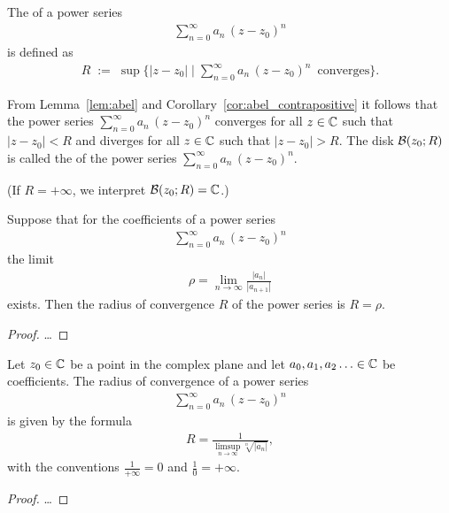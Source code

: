 \begin{definition}
  \label{def:radius_of_convergence}
  The  of a power series
  \begin{align*}
    \sum_{n=0}^\infty a_n \, (z-z_0)^n
  \end{align*}
  is defined as
  \begin{align*}
    R \; := \;
      \sup \bigg\{ |z-z_0| \; \bigg| \;
        \sum_{n=0}^\infty a_n \, (z-z_0)^n \, \text{ converges} \bigg\} .
  \end{align*}

  From Lemma~\ref{lem:abel} and Corollary~\ref{cor:abel_contrapositive}
  it follows that the power series $\sum_{n=0}^\infty a_n \, (z-z_0)^n$
  converges for all $z \in \bC$ such that $|z-z_0| < R$
  and diverges for all $z \in \bC$ such that $|z-z_0| > R$.
  The disk $\DiskRC{R}{z_0}$ is called the 
  of the power series $\sum_{n=0}^\infty a_n \, (z-z_0)^n$.

  (If $R=+\infty$, we interpret $\DiskRC{R}{z_0} = \bC$.)
\end{definition}

\begin{lemma}
  \label{lem:ratio_test_radius_of_convergence}
  Suppose that for the coefficients of a power series
  \begin{align*}
    \sum_{n=0}^\infty a_n \, (z-z_0)^n
  \end{align*}
  the limit
  \begin{align*}
    \rho = \lim_{n \to \infty} \frac{|a_n|}{|a_{n+1}|}
  \end{align*}
  exists. Then the radius of convergence $R$ of the power series
  is $R = \rho$.
\end{lemma}
\begin{proof}
  \ldots
\end{proof}

\begin{theorem}
  \label{thm:hadamard_formula}
  Let $z_0 \in \bC$ be a point in the complex plane
  and let $a_0,a_1,a_2\ldots \in \bC$ be coefficients.
  The radius of convergence of a power series
  \begin{align*}
    \sum_{n=0}^\infty a_n \, (z-z_0)^n
  \end{align*}
  is given by the formula
  \begin{align*}
    R = \frac{1}{\limsup_{n \to \infty} \sqrt[n]{|a_n|}} ,
  \end{align*}
  with the conventions $\frac{1}{+\infty}=0$ and $\frac{1}{0} = +\infty$.
\end{theorem}
\begin{proof}
  \ldots
\end{proof}

